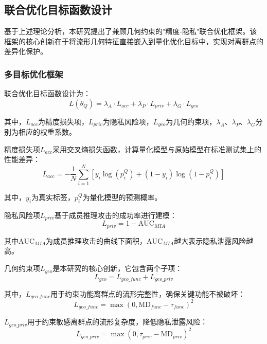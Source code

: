 \subsection{联合优化目标函数设计}

基于上述理论分析，本研究提出了兼顾几何约束的"精度-隐私"联合优化框架。该框架的核心创新在于将流形几何特征直接嵌入到量化优化目标中，实现对离群点的差异化保护。

\subsubsection{多目标优化框架}

联合优化目标函数设计为：
\begin{equation}
L(\theta_Q) = \lambda_A \cdot L_{acc} + \lambda_P \cdot L_{priv} + \lambda_G \cdot L_{geo}
\end{equation}

其中，$L_{acc}$为精度损失项，$L_{priv}$为隐私风险项，$L_{geo}$为几何约束项，$\lambda_A$、$\lambda_P$、$\lambda_G$分别为相应的权重系数。

精度损失项$L_{acc}$采用交叉熵损失函数，计算量化模型与原始模型在标准测试集上的性能差异：
\begin{equation}
L_{acc} = -\frac{1}{N}\sum_{i=1}^N [y_i \log(p_i^Q) + (1-y_i) \log(1-p_i^Q)]
\end{equation}

其中，$y_i$为真实标签，$p_i^Q$为量化模型的预测概率。

隐私风险项$L_{priv}$基于成员推理攻击的成功率进行建模：
\begin{equation}
L_{priv} = 1 - \text{AUC}_{MIA}
\end{equation}

其中$\text{AUC}_{MIA}$为成员推理攻击的曲线下面积，$\text{AUC}_{MIA}$越大表示隐私泄露风险越高。

几何约束项$L_{geo}$是本研究的核心创新，它包含两个子项：
\begin{equation}
L_{geo} = L_{geo\_func} + L_{geo\_priv}
\end{equation}

其中，$L_{geo\_func}$用于约束功能离群点的流形完整性，确保关键功能不被破坏：
\begin{equation}
L_{geo\_func} = \max(0, \text{MD}_{func} - \tau_{func})^2
\end{equation}

$L_{geo\_priv}$用于约束敏感离群点的流形复杂度，降低隐私泄露风险：
\begin{equation}
L_{geo\_priv} = \max(0, \tau_{priv} - \text{MD}_{priv})^2
\end{equation}

